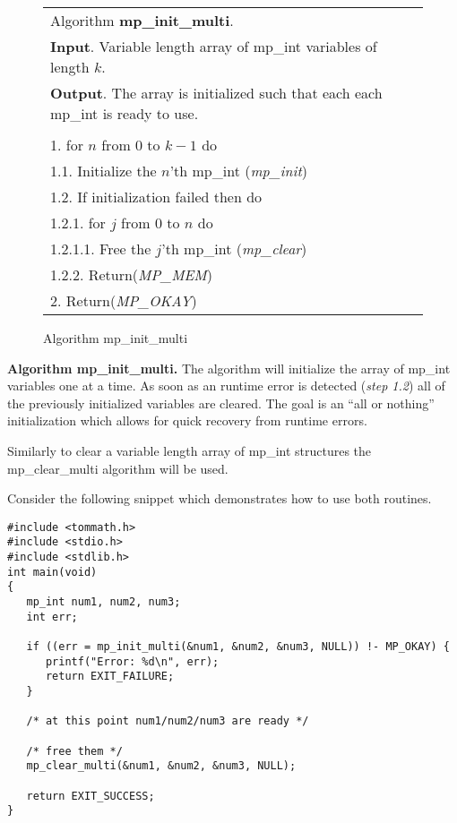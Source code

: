\documentclass[b5paper]{book}
\begin{document}
\begin{figure}[here]
\begin{center}
\begin{tabular}{l}
\hline Algorithm \textbf{mp\_init\_multi}. \\
\textbf{Input}.   Variable length array of mp\_int variables of length $k$. \\
\textbf{Output}.  The array is initialized such that each each mp\_int is ready to use. \\
\hline \\
1.  for $n$ from 0 to $k - 1$ do \\
\hspace{+3mm}1.1.  Initialize the $n$'th mp\_int (\textit{mp\_init}) \\
\hspace{+3mm}1.2.  If initialization failed then do \\
\hspace{+6mm}1.2.1.  for $j$ from $0$ to $n$ do \\
\hspace{+9mm}1.2.1.1.  Free the $j$'th mp\_int (\textit{mp\_clear}) \\
\hspace{+6mm}1.2.2.   Return(\textit{MP\_MEM}) \\
2.  Return(\textit{MP\_OKAY}) \\
\hline
\end{tabular}
\end{center}
\caption{Algorithm mp\_init\_multi}
\end{figure}

\textbf{Algorithm mp\_init\_multi.}
The algorithm will initialize the array of mp\_int variables one at a time.  As soon as an runtime error is detected (\textit{step 1.2}) all of
the previously initialized variables are cleared.  The goal is an ``all or nothing'' initialization which allows for quick recovery from runtime 
errors.

Similarly to clear a variable length array of mp\_int structures the mp\_clear\_multi algorithm will be used.

Consider the following snippet which demonstrates how to use both routines.
\begin{small}
\begin{verbatim}
#include <tommath.h>
#include <stdio.h>
#include <stdlib.h>
int main(void)
{
   mp_int num1, num2, num3;
   int err;
   
   if ((err = mp_init_multi(&num1, &num2, &num3, NULL)) !- MP_OKAY) {
      printf("Error: %d\n", err);
      return EXIT_FAILURE;
   }
   
   /* at this point num1/num2/num3 are ready */
   
   /* free them */
   mp_clear_multi(&num1, &num2, &num3, NULL);
   
   return EXIT_SUCCESS;
}
\end{verbatim}
\end{small}
\end{document}
